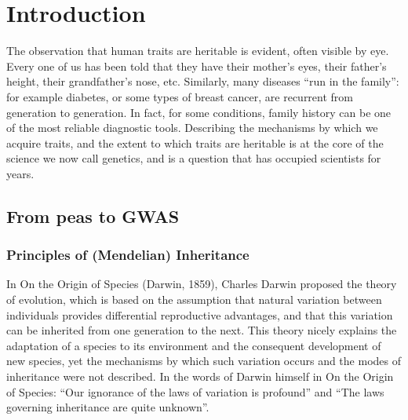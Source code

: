 \chapter{Introduction}  %

The observation that human traits are heritable is evident, often visible by eye. 
Every one of us has been told that they have their mother’s eyes, their father’s height, their grandfather’s nose, etc. 
Similarly, many diseases “run in the family”: for example diabetes, or some types of breast cancer, are recurrent from generation to generation. 
In fact, for some conditions, family history can be one of the most reliable diagnostic tools. 
Describing the mechanisms by which we acquire traits, and the extent to which traits are heritable is at the core of the science we now call genetics, and is a question that has occupied scientists for years.

\section{From peas to GWAS}  %

\subsection{Principles of (Mendelian) Inheritance} %

In On the Origin of Species (Darwin, 1859), Charles Darwin proposed the theory of evolution, which is based on the assumption that natural variation between individuals provides differential reproductive advantages, and that this variation can be inherited from one generation to the next. 
This theory nicely explains the adaptation of a species to its environment and the consequent development of new species, yet the mechanisms by which such variation occurs and the modes of inheritance were not described. 
In the words of Darwin himself in On the Origin of Species: “Our ignorance of the laws of variation is profound” and “The laws governing inheritance are quite unknown”.\\

